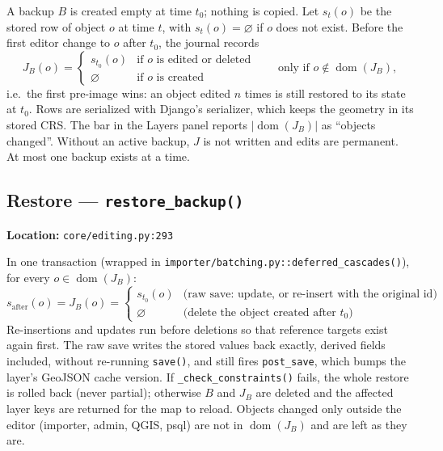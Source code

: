 \documentclass[11pt]{article}
\newcommand{\code}[1]{\texttt{#1}}
\begin{document}
A backup $B$ is created empty at time $t_0$; nothing is copied. Let $s_t(o)$ be the stored row of object $o$ at time $t$, with $s_t(o) = \varnothing$ if $o$ does not exist. Before the first editor change to $o$ after $t_0$, the journal records
\begin{equation}
  J_B(o) = \begin{cases}
    s_{t_0}(o) & \text{if $o$ is edited or deleted} \\
    \varnothing & \text{if $o$ is created}
  \end{cases}
  \qquad \text{only if } o \notin \operatorname{dom}(J_B),
\end{equation}
i.e.\ the first pre-image wins: an object edited $n$ times is still restored to its state at $t_0$. Rows are serialized with Django's serializer, which keeps the geometry in its stored CRS. The bar in the Layers panel reports $|\operatorname{dom}(J_B)|$ as ``objects changed''. Without an active backup, $J$ is not written and edits are permanent. At most one backup exists at a time.

\subsection{Restore --- \code{restore\_backup()}}
\textbf{Location:} \code{core/editing.py:293}

In one transaction (wrapped in \code{importer/batching.py::deferred\_cascades()}), for every $o \in \operatorname{dom}(J_B)$:
\begin{equation}
  s_{\text{after}}(o) = J_B(o) =
  \begin{cases}
    s_{t_0}(o) & \text{(raw save: update, or re-insert with the original id)} \\
    \varnothing & \text{(delete the object created after $t_0$)}
  \end{cases}
\end{equation}
Re-insertions and updates run before deletions so that reference targets exist again first. The raw save writes the stored values back exactly, derived fields included, without re-running \code{save()}, and still fires \code{post\_save}, which bumps the layer's GeoJSON cache version. If \code{\_check\_constraints()} fails, the whole restore is rolled back (never partial); otherwise $B$ and $J_B$ are deleted and the affected layer keys are returned for the map to reload. Objects changed only outside the editor (importer, admin, QGIS, psql) are not in $\operatorname{dom}(J_B)$ and are left as they are.
\end{document}
